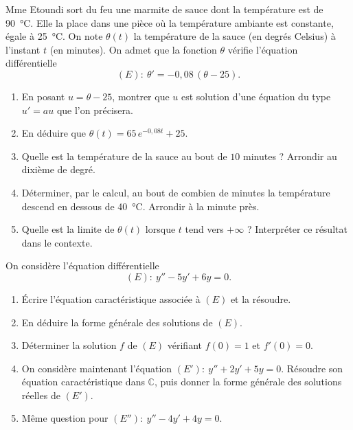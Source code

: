 \documentclass[11pt]{article}
\begin{document}
\begin{exercice}
Mme Etoundi sort du feu une marmite de sauce dont la température est de \SI{90}{\celsius}. Elle la place dans une pièce où la température ambiante est constante, égale à \SI{25}{\celsius}. On note $\theta(t)$ la température de la sauce (en degrés Celsius) à l'instant $t$ (en minutes). On admet que la fonction $\theta$ vérifie l'équation différentielle
\[
(E):\ \theta'=-0{,}08\,(\theta-25).
\]
\begin{enumerate}
\item En posant $u=\theta-25$, montrer que $u$ est solution d'une équation du type $u'=au$ que l'on précisera.
\item En déduire que $\theta(t)=65\,e^{-0{,}08t}+25$.
\item Quelle est la température de la sauce au bout de $10$ minutes ? Arrondir au dixième de degré.
\item Déterminer, par le calcul, au bout de combien de minutes la température descend en dessous de \SI{40}{\celsius}. Arrondir à la minute près.
\item Quelle est la limite de $\theta(t)$ lorsque $t$ tend vers $+\infty$ ? Interpréter ce résultat dans le contexte.
\end{enumerate}
\end{exercice}

\begin{exercice}
On considère l'équation différentielle
\[
(E):\ y''-5y'+6y=0.
\]
\begin{enumerate}
\item Écrire l'équation caractéristique associée à $(E)$ et la résoudre.
\item En déduire la forme générale des solutions de $(E)$.
\item Déterminer la solution $f$ de $(E)$ vérifiant $f(0)=1$ et $f'(0)=0$.
\item On considère maintenant l'équation $(E'):\ y''+2y'+5y=0$. Résoudre son équation caractéristique dans $\mathbb{C}$, puis donner la forme générale des solutions réelles de $(E')$.
\item Même question pour $(E''):\ y''-4y'+4y=0$.
\end{enumerate}
\end{exercice}
\end{document}
